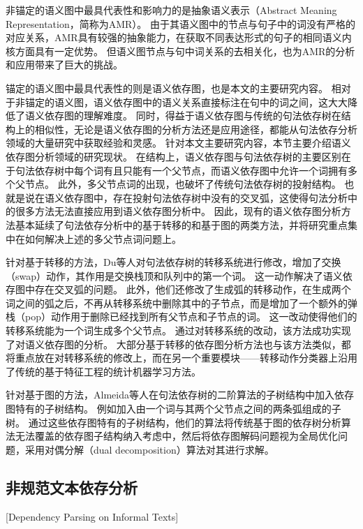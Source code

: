 非锚定的语义图中最具代表性和影响力的是抽象语义表示（Abstract Meaning Representation，简称为AMR）。\cite{banarescu-etal-2013-abstract}
由于其语义图中的节点与句子中的词没有严格的对应关系，AMR具有较强的抽象能力，在获取不同表达形式的句子的相同语义内核方面具有一定优势。
但语义图节点与句中词关系的去相关化，也为AMR的分析和应用带来了巨大的挑战。

锚定的语义图中最具代表性的则是语义依存图，也是本文的主要研究内容。
相对于非锚定的语义图，语义依存图中的语义关系直接标注在句中的词之间，这大大降低了语义依存图的理解难度。
同时，得益于语义依存图与传统的句法依存树在结构上的相似性，无论是语义依存图的分析方法还是应用途径，都能从句法依存分析领域的大量研究中获取经验和灵感。
针对本文主要研究内容，本节主要介绍语义依存图分析领域的研究现状。
在结构上，语义依存图与句法依存树的主要区别在于句法依存树中每个词有且只能有一个父节点，而语义依存图中允许一个词拥有多个父节点。
此外，多父节点词的出现，也破坏了传统句法依存树的投射结构。
也就是说在语义依存图中，存在投射句法依存树中没有的交叉弧，这使得句法分析中的很多方法无法直接应用到语义依存图分析中。
因此，现有的语义依存图分析方法基本延续了句法依存分析中的基于转移的和基于图的两类方法，并将研究重点集中在如何解决上述的多父节点词问题上。

针对基于转移的方法，Du等人对句法依存树的转移系统进行修改\cite{du-etal-2014-peking}，增加了交换（swap）动作，其作用是交换栈顶和队列中的第一个词。
这一动作解决了语义依存图中存在交叉弧的问题。
此外，他们还修改了生成弧的转移动作，在生成两个词之间的弧之后，不再从转移系统中删除其中的子节点，而是增加了一个额外的弹栈（pop）动作用于删除已经找到所有父节点和子节点的词。
这一改动使得他们的转移系统能为一个词生成多个父节点。
通过对转移系统的改动，该方法成功实现了对语义依存图的分析。
大部分基于转移的依存图分析方法\cite{sagae-tsujii-2008-shift,titov-etal-2009-online}也与该方法类似，都将重点放在对转移系统的修改上，而在另一个重要模块——转移动作分类器上沿用了传统的基于特征工程的统计机器学习方法。

针对基于图的方法，Almeida等人在句法依存树的二阶算法的子树结构中加入依存图特有的子树结构。\cite{martins-almeida-2014-priberam}
例如加入由一个词与其两个父节点之间的两条弧组成的子树。
通过这些依存图特有的子树结构，他们的算法将传统基于图的依存树分析算法无法覆盖的依存图子结构纳入考虑中，然后将依存图解码问题视为全局优化问题，采用对偶分解（dual decomposition）算法对其进行求解。

\subsection{非规范文本依存分析}[Dependency Parsing on Informal Texts]
\label{sec:chapter1-informal}


